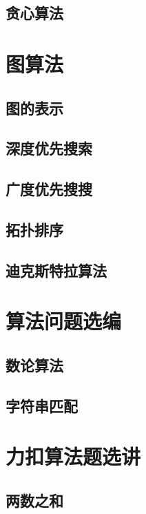 \documentclass[oneside,10pt,fontset=none]{ctexbook}
\begin{document}
\chapter{贪心算法}

\part{图算法}

\chapter{图的表示}

\chapter{深度优先搜索}

\chapter{广度优先搜搜}

\chapter{拓扑排序}

\chapter{迪克斯特拉算法}

\part{算法问题选编}

\chapter{数论算法}

\chapter{字符串匹配}

\part{力扣算法题选讲}

\chapter{两数之和}
\end{document}
